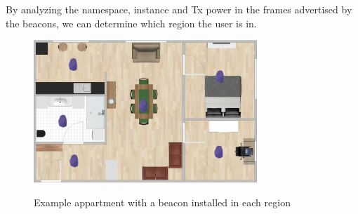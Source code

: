By analyzing the namespace, instance and Tx power in the frames advertised by the beacons, we can determine which region the user is in.

\begin{figure}[h!]
\centering
\includegraphics[width=0.75\textwidth]{images/room-with-beacons}
\label{fig:design:ble-positioning:room}
\caption{Example appartment with a beacon installed in each region}
\end{figure}

